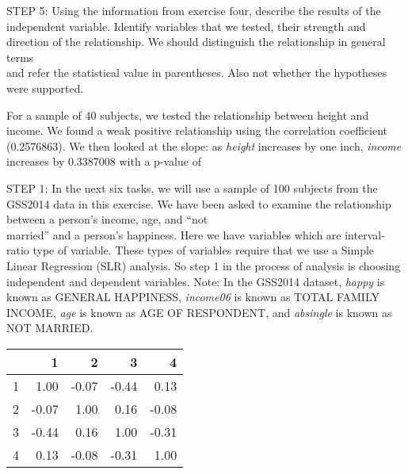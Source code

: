 \documentclass[11pt]{book}\usepackage[]{graphicx}\usepackage[]{color}
\begin{document}
\begin{exercises}
\begin{solution}
    \end{solution}

      \begin{exercise} %


    STEP 5: Using the information from exercise four, describe the results of the independent variable.  Identify variables that we tested, their strength and direction of the relationship.  We should distinguish the relationship in general terms \\ and refer the statistical value in parentheses.  Also not whether the hypotheses were supported.

    \vspace{10mm}

    \end{exercise}
    \begin{solution}      %

    For a sample of 40 subjects, we tested the relationship between height and income.  We found a weak positive relationship using the correlation coefficient (0.2576863).  We then looked at the slope:  as {\textit{height}} increases by one inch, {\textit{income}} increases by 0.3387008 with a p-value of

    \end{solution}

  \begin{exercise} %

    STEP 1:  In the next six tasks, we will use a sample of 100 subjects from the GSS2014 data in this exercise.  We have been asked to examine the relationship between a person's income, age, and ``not \\ married'' and a person's happiness.  Here we have variables which are  interval-ratio type of variable.  These types of variables require that we use a Simple Linear Regression (SLR) analysis.  So step 1 in the process of analysis is choosing independent and dependent variables.  Note: In the GSS2014 dataset, {\textit{happy}} is known as GENERAL HAPPINESS, {\textit{income06}} is known as TOTAL FAMILY INCOME, {\textit{age}} is known as AGE OF RESPONDENT, and {\textit{absingle}} is known as NOT MARRIED.

{\small{
\begin{table}[ht]
\centering
\begin{tabular}{rrrrr}
  \hline
 & 1 & 2 & 3 & 4 \\ 
  \hline
1 & 1.00 & -0.07 & -0.44 & 0.13 \\ 
  2 & -0.07 & 1.00 & 0.16 & -0.08 \\ 
  3 & -0.44 & 0.16 & 1.00 & -0.31 \\ 
  4 & 0.13 & -0.08 & -0.31 & 1.00 \\ 
   \hline
\end{tabular}
\end{table}

}}
\end{exercise}
\end{exercises}
\end{document}
